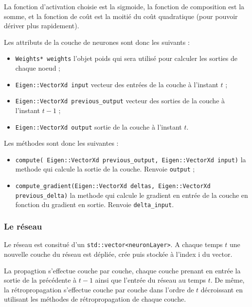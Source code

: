 \medskip

La fonction d'activation choisie est la sigmoide, la fonction de composition
est la somme, et la fonction de coût est la moitié du coût quadratique (pour
pouvoir dériver plus rapidement).

\medskip

Les attributs de la couche de neurones sont donc les suivants :

\begin{itemize}
  \item \verb+Weights* weights+ l'objet poids qui sera utilisé pour calculer
    les sorties de chaque noeud ;
  \item \verb+Eigen::VectorXd input+ vecteur des entrées de la couche à
    l'instant $t$ ;
  \item \verb+Eigen::VectorXd previous_output+ vecteur des sorties de la
    couche à l'instant $t-1$ ;
  \item \verb+Eigen::VectorXd output+ sortie de la couche à l'instant $t$.
\end{itemize}

Les méthodes sont donc les suivantes :

\begin{itemize}
  \item \verb+compute( Eigen::VectorXd previous_output, Eigen::VectorXd input)+
    la methode qui calcule la sortie de la couche. Renvoie \verb+output+ ;
  \item \verb+compute_gradient(Eigen::VectorXd deltas, Eigen::VectorXd previous_delta)+
    la methode qui calcule le gradient en entrée de la couche en fonction du
    gradient en sortie. Renvoie \verb+delta_input+.
\end{itemize}


\subsubsection{Le réseau}

Le réseau est consitué d'un \verb+std::vector<neuronLayer>+. A chaque temps $t$
une nouvelle couche du réseau est dépliée, crée puis stockée à l'index i du
vector.

\medskip

La propagtion s'effectue couche par couche, chaque couche prenant en entrée la
sortie de la précédente à $t-1$ ainsi que l'entrée du réseau au temps $t$.
De même, la rétropropagation s'effectue couche par couche dans l'ordre de $t$
décroissant en utilisant les méthodes de rétropropagation de chaque couche.

